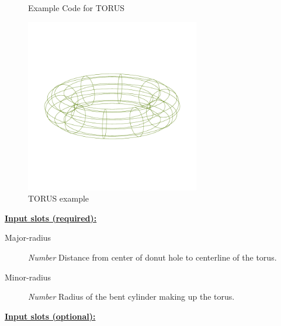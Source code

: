 \documentclass [11pt]{book}
\begin{document}
\begin{itemize}
\begin{figure}
\begin{lrbox}{\boxedverb}
\begin{minipage}{\linewidth}
{\begin{verbatim}
\end{verbatim}}
\end{minipage}
\end{lrbox}
\fbox{\usebox{\boxedverb}}

\caption{Example Code for TORUS}

\label{fig:example-code-TORUS}

\end{figure}

\begin{figure}
\begin{center}
\includegraphics[width=3in,height=3in]{../images/example-TORUS.pdf}
\end{center}

\caption{TORUS example}

\label{fig:TORUS}

\end{figure}





\textbf{
\underline{Input slots (required):}}

\begin{description}

\item [Major-radius]
\emph{Number} Distance from center of donut hole to centerline of the torus.


\item [Minor-radius]
\emph{Number} Radius of the bent cylinder making up the torus.


\end{description}






\textbf{
\underline{Input slots (optional):}}


\end{itemize}
\end{document}
